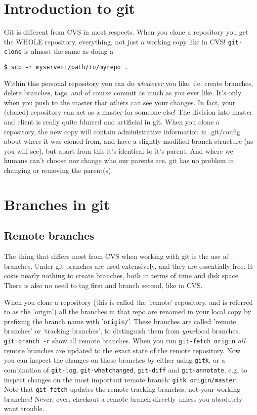 \documentclass[a4paper,10pt]{article}
\begin{document}
\section{Introduction to git}
Git is different from CVS in most respects. When you clone a repository you
get the WHOLE repository, everything, not just a working copy like in CVS!
\texttt{git-clone} is almost the same as doing a
\begin{verbatim}
$ scp -r myserver:/path/to/myrepo .
\end{verbatim}
Within this personal repository you can do \textit{whatever} you like, i.e. create
branches, delete branches, tags, and of course commit as much as you ever
like. It's only when you push to the master that others can see your changes.
In fact, your (cloned) repository can act as a master for someone else! The
division into master and client is really quite blurred and artificial in git.
When you clone a repository, the new copy will contain administrative
information in .git/config about where it was cloned from, and have a slightly
modified branch structure (as you will see), but apart from this it's
identical to it's parent. And where we humans can't choose nor change who our
parents are, git has no problem in changing or removing the parent(s).

\section{Branches in git}
\subsection{Remote branches}
The thing that differs most from CVS when working with git is the use of
branches. Under git branches are used extensively, and they are essentially
free. It costs nearly nothing to create branches, both in terms of time and
disk space. There is also no need to tag first and branch second, like in CVS.

When you clone a repository
(this is called the 'remote' repository, and is referred to as the 'origin')
all the branches in that repo are renamed in your local copy by prefixing the
branch name with '\texttt{origin/}'. These branches are called 'remote
branches' or 'tracking branches', to distinguish them from \emph{your}local
branches.  \texttt{git branch -r} show all remote branches. When you run
\texttt{git-fetch origin} \emph{all} remote branches are updated to the exact
state of the remote repository. Now you can inspect the changes on those
branches by either using \texttt{gitk}, or a combination of \texttt{git-log},
\texttt{git-whatchanged}, \texttt{git-diff} and \texttt{git-annotate}, e.g. to
inspect changes on the most important remote branch: \texttt{gitk
origin/master}. Note
that \texttt{git-fetch} updates the remote tracking branches, not your working branches!
Never, ever, checkout a remote branch directly unless you absolutely want
trouble. 
\end{document}
